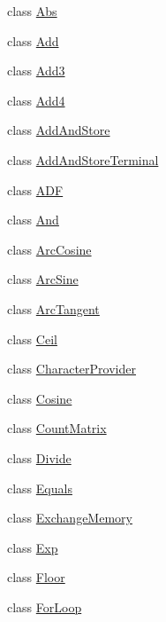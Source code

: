 \begin{DoxyCompactItemize}
\item 
class \hyperlink{classorg_1_1jgap_1_1gp_1_1function_1_1_abs}{Abs}
\item 
class \hyperlink{classorg_1_1jgap_1_1gp_1_1function_1_1_add}{Add}
\item 
class \hyperlink{classorg_1_1jgap_1_1gp_1_1function_1_1_add3}{Add3}
\item 
class \hyperlink{classorg_1_1jgap_1_1gp_1_1function_1_1_add4}{Add4}
\item 
class \hyperlink{classorg_1_1jgap_1_1gp_1_1function_1_1_add_and_store}{Add\-And\-Store}
\item 
class \hyperlink{classorg_1_1jgap_1_1gp_1_1function_1_1_add_and_store_terminal}{Add\-And\-Store\-Terminal}
\item 
class \hyperlink{classorg_1_1jgap_1_1gp_1_1function_1_1_a_d_f}{A\-D\-F}
\item 
class \hyperlink{classorg_1_1jgap_1_1gp_1_1function_1_1_and}{And}
\item 
class \hyperlink{classorg_1_1jgap_1_1gp_1_1function_1_1_arc_cosine}{Arc\-Cosine}
\item 
class \hyperlink{classorg_1_1jgap_1_1gp_1_1function_1_1_arc_sine}{Arc\-Sine}
\item 
class \hyperlink{classorg_1_1jgap_1_1gp_1_1function_1_1_arc_tangent}{Arc\-Tangent}
\item 
class \hyperlink{classorg_1_1jgap_1_1gp_1_1function_1_1_ceil}{Ceil}
\item 
class \hyperlink{classorg_1_1jgap_1_1gp_1_1function_1_1_character_provider}{Character\-Provider}
\item 
class \hyperlink{classorg_1_1jgap_1_1gp_1_1function_1_1_cosine}{Cosine}
\item 
class \hyperlink{classorg_1_1jgap_1_1gp_1_1function_1_1_count_matrix}{Count\-Matrix}
\item 
class \hyperlink{classorg_1_1jgap_1_1gp_1_1function_1_1_divide}{Divide}
\item 
class \hyperlink{classorg_1_1jgap_1_1gp_1_1function_1_1_equals}{Equals}
\item 
class \hyperlink{classorg_1_1jgap_1_1gp_1_1function_1_1_exchange_memory}{Exchange\-Memory}
\item 
class \hyperlink{classorg_1_1jgap_1_1gp_1_1function_1_1_exp}{Exp}
\item 
class \hyperlink{classorg_1_1jgap_1_1gp_1_1function_1_1_floor}{Floor}
\item 
class \hyperlink{classorg_1_1jgap_1_1gp_1_1function_1_1_for_loop}{For\-Loop}

\end{DoxyCompactItemize}
